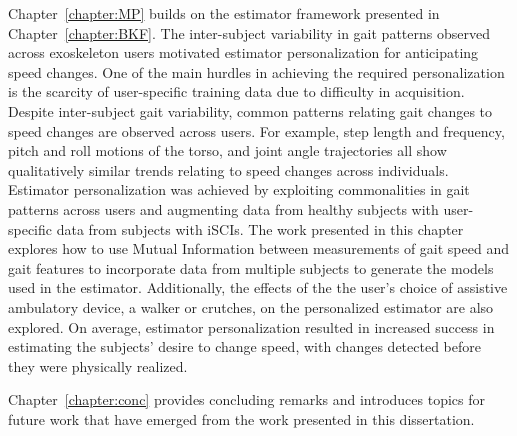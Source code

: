 Chapter~\ref{chapter:MP} builds on the estimator framework presented in Chapter~\ref{chapter:BKF}. The inter-subject variability in gait patterns observed across exoskeleton users motivated estimator personalization for anticipating speed changes. One of the main hurdles in achieving the required personalization is the scarcity of user-specific training data due to difficulty in acquisition. Despite inter-subject gait variability, common patterns relating gait changes to speed changes are observed across users.
For example, step length and frequency, pitch and roll motions of the torso, and joint angle trajectories all show qualitatively similar trends relating to speed changes across individuals. Estimator personalization was achieved by exploiting commonalities in gait patterns across users and augmenting data from healthy subjects with user-specific data from subjects with iSCIs. The work presented in this chapter explores how to use Mutual Information between measurements of gait speed and gait features to incorporate data from multiple subjects to generate the models used in the estimator. Additionally, the effects of the the user's choice of assistive ambulatory device, a walker or crutches, on the personalized estimator are also explored. On average, estimator personalization resulted in increased success in estimating the subjects' desire to change speed, with changes detected before they were physically realized.

Chapter~\ref{chapter:conc} provides concluding remarks and introduces topics for future work that have emerged from the work presented in this dissertation.

